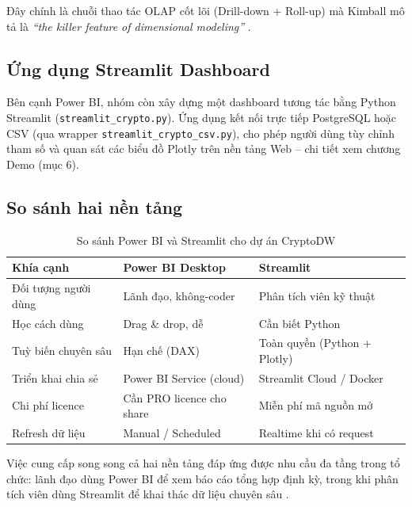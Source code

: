 Đây chính là chuỗi thao tác OLAP cốt lõi (Drill-down + Roll-up) mà Kimball mô tả là \emph{``the killer feature of dimensional modeling''} \cite{kimball2013}.

\subsection{Ứng dụng Streamlit Dashboard}

Bên cạnh Power BI, nhóm còn xây dựng một dashboard tương tác bằng Python Streamlit (\texttt{streamlit\_crypto.py}). Ứng dụng kết nối trực tiếp PostgreSQL hoặc CSV (qua wrapper \texttt{streamlit\_crypto\_csv.py}), cho phép người dùng tùy chỉnh tham số và quan sát các biểu đồ Plotly trên nền tảng Web -- chi tiết xem chương Demo (mục 6).

\subsection{So sánh hai nền tảng}

\begin{table}[H]
\centering
\caption{So sánh Power BI và Streamlit cho dự án CryptoDW}
\label{tab:pbi_vs_streamlit}
\small
\begin{tabular}{@{}lll@{}}
\toprule
\textbf{Khía cạnh} & \textbf{Power BI Desktop} & \textbf{Streamlit} \\ \midrule
Đối tượng người dùng & Lãnh đạo, không-coder & Phân tích viên kỹ thuật \\
Học cách dùng & Drag \& drop, dễ & Cần biết Python \\
Tuỳ biến chuyên sâu & Hạn chế (DAX) & Toàn quyền (Python + Plotly) \\
Triển khai chia sẻ & Power BI Service (cloud) & Streamlit Cloud / Docker \\
Chi phí licence & Cần PRO licence cho share & Miễn phí mã nguồn mở \\
Refresh dữ liệu & Manual / Scheduled & Realtime khi có request \\ \bottomrule
\end{tabular}
\end{table}

Việc cung cấp song song cả hai nền tảng đáp ứng được nhu cầu đa tầng trong tổ chức: lãnh đạo dùng Power BI để xem báo cáo tổng hợp định kỳ, trong khi phân tích viên dùng Streamlit để khai thác dữ liệu chuyên sâu \cite{vanderplas2016}.
